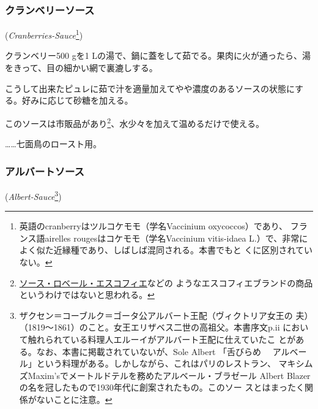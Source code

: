 \begin{recette}
\hypertarget{cranberries-sauce}{%
\subsubsection{クランベリーソース}\label{cranberries-sauce}}

 (\emph{Cranberries-Sauce}\footnote{英語のcranberryはツルコケモモ（学名Vaccinium
  oxycoccos）であり、 フランス語airelles rougesはコケモモ（学名Vaccinium
  vitis-idaea
  L.）で、非常によく似た近縁種であり、しばしば混同される。本書でもと
  くに区別されていない。})



クランベリー500 gを1
Lの湯で、鍋に蓋をして茹でる。果肉に火が通ったら、湯をきって、目の細かい網で裏漉しする。

こうして出来たピュレに茹で汁を適量加えてやや濃度のあるソースの状態にする。好みに応じて砂糖を加える。

このソースは市販品があり\footnote{\protect\hyperlink{sauce-robert-escoffier}{ソース・ロベール・エスコフィエ}などの
  ようなエスコフィエブランドの商品というわけではないと思われる。}、水少々を加えて温めるだけで使える。

\ldots{}\ldots{}七面鳥のロースト用。

\maeaki

\hypertarget{albert-sauce}{%
\subsubsection{アルバートソース}\label{albert-sauce}}

 (\emph{Albert-Sauce}\footnote{ザクセン＝コーブルク＝ゴータ公アルバート王配（ヴィクトリア女王の
  夫）（1819〜1861）のこと。女王エリザベス二世の高祖父。本書序文p.ii
  において触れられている料理人エルーイがアルバート王配に仕えていたこ
  とがある。なお、本書に掲載されていないが、Sole Albert 「舌びらめ　
  アルベール」という料理がある。しかしながら、これはパリのレストラン、
  マキシムズMaxim'sでメートルドテルを務めたアルベール・ブラゼール Albert
  Blazerの名を冠したもので1930年代に創案されたもの。このソー
  スとはまったく関係がないことに注意。})


\end{recette}
